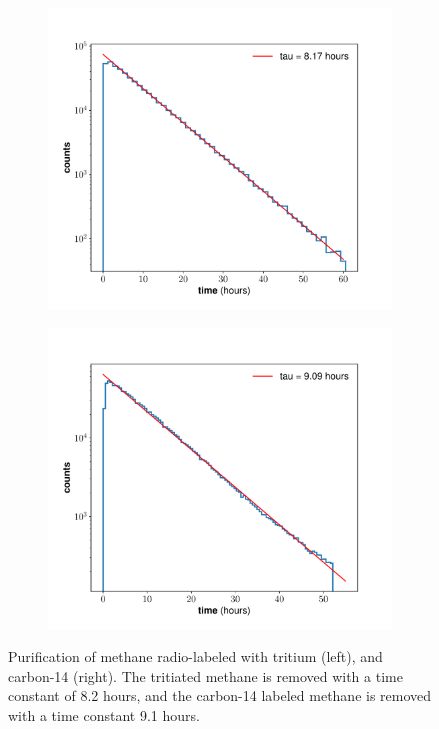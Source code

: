 \begin{figure}[h!]
\centering
\begin{subfigure}{0.5\textwidth}
  \centering
  \includegraphics[width=\textwidth]{Figures/H3_removal_time.pdf}
\end{subfigure}%
\begin{subfigure}{0.5\textwidth}
  \centering
  \includegraphics[width=\textwidth]{Figures/C14_removal_time.pdf}
\end{subfigure}
\caption{Purification of methane radio-labeled with tritium (left), and carbon-14 (right). The tritiated methane is removed with a time constant of 8.2 hours, and the carbon-14 labeled methane is removed with a time constant 9.1 hours. }
\label{fig:removaltime}
\end{figure}




